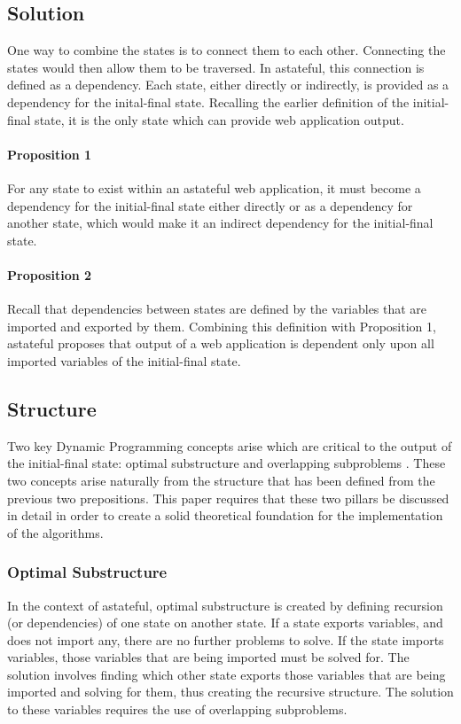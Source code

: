 \documentclass[11pt,twocolumn]{article}
\begin{document}
\subsection{Solution}
One way to combine the states is to connect them to each other. Connecting the states would then allow them to be traversed. In astateful, this connection is defined as a dependency. Each state, either directly or indirectly, is provided as a dependency for the inital-final state. Recalling the earlier definition of the initial-final state, it is the only state which can provide web application output.
\paragraph{Proposition 1}
For any state to exist within an astateful web application, it must become a dependency for the initial-final state either directly or as a dependency for another state, which would make it an indirect dependency for the initial-final state.
\paragraph{Proposition 2}
Recall that dependencies between states are defined by the variables that are imported and exported by them. Combining this definition with Proposition 1, astateful proposes that output of a web application is dependent only upon all imported variables of the initial-final state.
\subsection{Structure}
Two key Dynamic Programming concepts arise which are critical to the output of the initial-final state: optimal substructure and overlapping subproblems \cite{dp}. These two concepts arise naturally from the structure that has been defined from the previous two prepositions. This paper requires that these two pillars be discussed in detail in order to create a solid theoretical foundation for the implementation of the algorithms.
\subsubsection{Optimal Substructure}
In the context of astateful, optimal substructure is created by defining recursion (or dependencies) of one state on another state. If a state exports variables, and does not import any, there are no further problems to solve. If the state imports variables, those variables that are being imported must be solved for. The solution involves finding which other state exports those variables that are being imported and solving for them, thus creating the recursive structure. The solution to these variables requires the use of overlapping subproblems.
\end{document}
